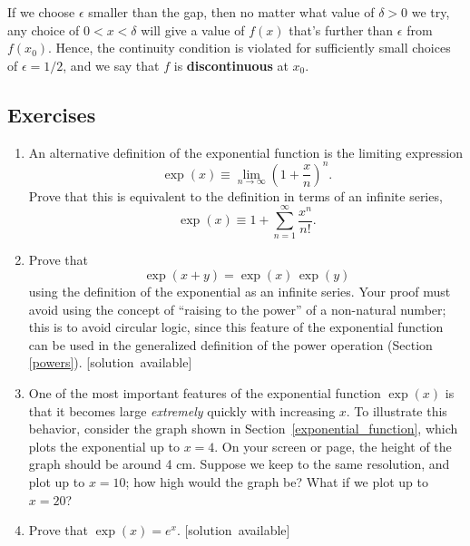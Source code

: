 \documentclass[10pt,a4paper]{article}
\begin{document}
\noindent
If we choose $\epsilon$ smaller than the gap, then no matter what
value of $\delta > 0$ we try, any choice of $0 < x < \delta$ will give
a value of $f(x)$ that's further than $\epsilon$ from $f(x_0)$. Hence,
the continuity condition is violated for sufficiently small choices of
$\epsilon = 1/2$, and we say that $f$ is \textbf{discontinuous} at
$x_0$.

\subsection{Exercises}\label{exercises}

\begin{enumerate}
  \def\labelenumi{\arabic{enumi}.}
\item
  An alternative definition of the exponential function is the limiting
  expression
  \begin{equation}
    \exp(x) \equiv \lim_{n\rightarrow\infty} \left(1+\frac{x}{n}\right)^n.
  \end{equation}
  Prove that this is equivalent to the definition in terms of an
  infinite series,
  \begin{equation}
    \exp(x) \equiv 1 + \sum_{n=1}^\infty\frac{x^n}{n!}.
  \end{equation}

\item
  Prove that
  \begin{equation}
    \exp(x+y) = \exp(x)\,\exp(y)
  \end{equation}
  using the definition of the exponential as an infinite series. Your
  proof must avoid using the concept of ``raising to the power'' of a
  non-natural number; this is to avoid circular logic, since this
  feature of the exponential function can be used in the generalized
  definition of the power operation (Section \ref{powers}).
  \hfill{\scriptsize [solution~available]}

\item
  One of the most important features of the exponential function
  $\exp(x)$ is that it becomes large \emph{extremely} quickly with
  increasing $x$. To illustrate this behavior, consider the graph
  shown in Section~\ref{exponential_function}, which plots the
  exponential up to $x = 4$.  On your screen or page, the height of
  the graph should be around 4 cm. Suppose we keep to the same
  resolution, and plot up to $x = 10$; how high would the graph be?
  What if we plot up to $x = 20$?

\item
  Prove that $\displaystyle \exp(x) = e^x.$
  \hfill{\scriptsize [solution~available]}


\end{enumerate}
\end{document}
